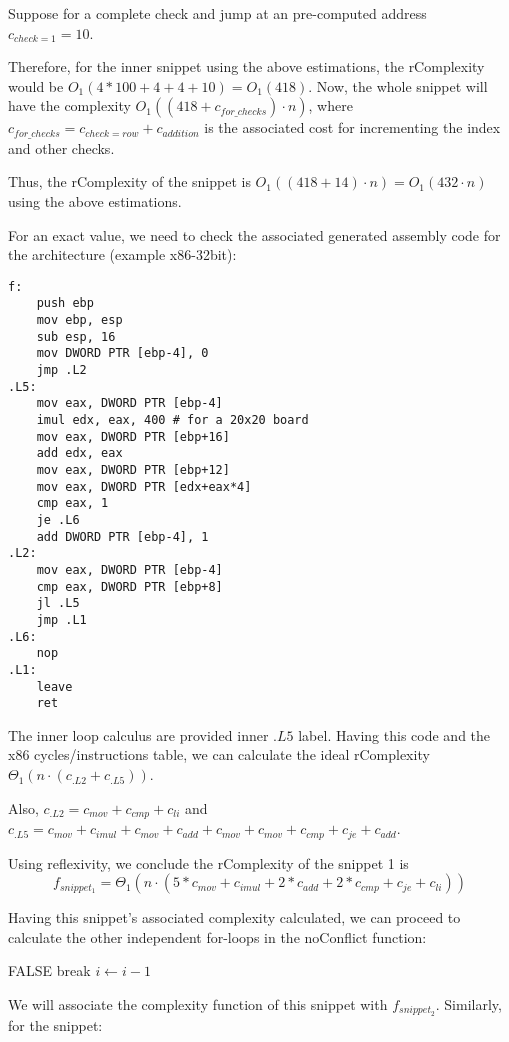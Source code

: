 Suppose for a complete check and jump at an pre-computed address $c_{check=1} = 10$.

Therefore, for the inner snippet using the above estimations, the rComplexity would be $O_{1}(4 * 100 + 4 + 4 + 10) = O_{1}(418)$. Now, the whole snippet will have the complexity $O_{1}((418 + c_{for\_checks}) \cdot n)$, where  $c_{for\_checks} = c_{check=row} + c_{addition}$ is the associated cost for incrementing the index and other checks.

Thus, the rComplexity of the snippet is $O_{1}((418 + 14) \cdot n) = O_{1}(432 \cdot n)$ using the above estimations.


For an exact value, we need to check the associated generated assembly code for the architecture (example x86-32bit):
\begin{verbatim}
f:
    push ebp
    mov ebp, esp
    sub esp, 16
    mov DWORD PTR [ebp-4], 0
    jmp .L2
.L5:
    mov eax, DWORD PTR [ebp-4]
    imul edx, eax, 400 # for a 20x20 board
    mov eax, DWORD PTR [ebp+16]
    add edx, eax
    mov eax, DWORD PTR [ebp+12]
    mov eax, DWORD PTR [edx+eax*4]
    cmp eax, 1
    je .L6
    add DWORD PTR [ebp-4], 1
.L2:
    mov eax, DWORD PTR [ebp-4]
    cmp eax, DWORD PTR [ebp+8]
    jl .L5
    jmp .L1
.L6:
    nop
.L1:
    leave
    ret
\end{verbatim}


The inner loop calculus are provided inner $.L5$ label. Having this code and the x86 cycles/instructions table, we can calculate the ideal rComplexity $\Theta_{1}(n \cdot (c_{.L2} + c_{.L5}))$.

Also, $c_{.L2} = c_{mov} + c_{cmp} + c_{li}$ and $c_{.L5} = c_{mov} + c_{imul} + c_{mov} + c_{add} + c_{mov} + c_{mov} + c_{cmp} + c_{je} + c_{add} $.

Using reflexivity, we conclude the rComplexity of the snippet 1 is \[f_{snippet_{1}} =  \Theta_{1}(n \cdot ( 5 * c_{mov} + c_{imul} + 2 * c_{add} +2 *  c_{cmp} + c_{je} + c_{li}))\]

Having this snippet's associated complexity calculated, we can proceed to calculate the other independent for-loops in the noConflict function:
\begin{algorithmic}[1]
    \State \Return FALSE
    \EndIf
    \State break
    \EndIf
    \State $i \gets i-1$
    \EndFor
\end{algorithmic}
We will associate the complexity function of this snippet with $f_{snippet_{2}}$. Similarly, for the snippet:

